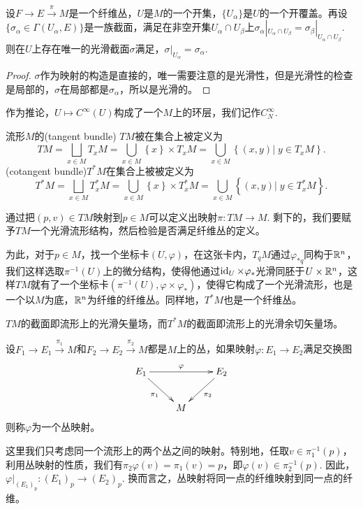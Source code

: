 \begin{lem}[局部化原理]\label{localprin}
设$F\to E\xrightarrow{\pi} M$是一个纤维丛，$U$是$M$的一个开集，$\{U_\alpha\}$是$U$的一个开覆盖。再设$\{\sigma_\alpha\in \Gamma(U_\alpha,E)\}$是一族截面，满足在非空开集$U_\alpha\cap U_\beta$上$\sigma_\alpha|_{U_\alpha\cap U_\beta}=\sigma_\beta|_{U_\alpha\cap U_\beta}$. 则在$U$上存在唯一的光滑截面$\sigma$满足，$\sigma|_{U_\alpha}=\sigma_\alpha$.
\end{lem}

\begin{proof}
$\sigma$作为映射的构造是直接的，唯一需要注意的是光滑性，但是光滑性的检查是局部的，$\sigma$在局部都是$\sigma_\alpha$，所以是光滑的。
\end{proof}

作为推论，$U\mapsto C^\infty(U)$构成了一个$M$上的环层，我们记作$C^\infty_N$.

\begin{para}[切丛与余切丛]
流形$M$的(tangent bundle) $TM$被在集合上被定义为
\[
	TM=\bigsqcup_{x\in M}T_xM=\bigcup_{x\in M} \left\{x\right\}\times T_xM=\bigcup_{x\in M} \left\{(x, y)\vert\; y\in T_xM\right\}.
\]
(cotangent bundle)$T^*M$在集合上被被定义为
\[
	T^*M=\bigsqcup_{x\in M}T^*_xM=\bigcup_{x\in M} \left\{x\right\}\times T^*_xM=\bigcup_{x\in M} \left\{(x, y)\vert\; y\in T_x^*M\right\}.
\]

通过把$(p,v)\in TM$映射到$p\in M$可以定义出映射$\pi: TM\to M$. 剩下的，我们要赋予$TM$一个光滑流形结构，然后检验是否满足纤维丛的定义。

为此，对于$p\in M$，找一个坐标卡$(U,\varphi)$，在这张卡内，$T_qM$通过$\varphi_{*q}$同构于$\mathbb{R}^n$，我们这样选取$\pi^{-1}(U)$上的微分结构，使得他通过$\operatorname{id}_U\times \varphi_*$光滑同胚于$U \times \mathbb{R}^n$，这样$TM$就有了一个坐标卡$(\pi^{-1}(U),\varphi\times \varphi_*)$，使得它构成了一个光滑流形，也是一个以$M$为底，$\mathbb{R}^n$为纤维的纤维丛。同样地，$T^*M$也是一个纤维丛。
\end{para}

$TM$的截面即流形上的光滑矢量场，而$T^*M$的截面即流形上的光滑余切矢量场。

\begin{para}[丛映射]
设$F_1\to E_1\xrightarrow{\pi_1} M$和$F_2\to E_2\xrightarrow{\pi_2} M$都是$M$上的丛，如果映射$\varphi:E_1\to E_2$满足交换图
\[
	\xymatrix{
	E_1\ar[rr]^\varphi\ar[rd]_{\pi_1}&&E_2\ar[ld]^{\pi_2}\\
	&M&
	}
\]
则称$\varphi$为一个丛映射。
\end{para}

这里我们只考虑同一个流形上的两个丛之间的映射。特别地，任取$v\in \pi_1^{-1}(p)$，利用丛映射的性质，我们有$\pi_2\varphi(v)=\pi_1(v)=p$，即$\varphi(v)\in \pi_2^{-1}(p)$. 因此，$\varphi|_{(E_1)_p}:(E_1)_p\to (E_2)_p$. 换而言之，丛映射将同一点的纤维映射到同一点的纤维。

